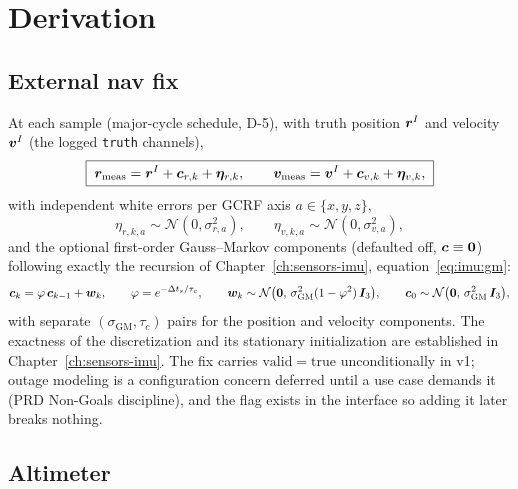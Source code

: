\section{Derivation}
\label{sec:radio:derivation}

\subsection{External nav fix}
\label{sec:radio:fix}

At each sample (major-cycle schedule, D-5), with truth position
$\bm{r}^{I}$ and velocity $\bm{v}^{I}$ (the logged \texttt{truth}
channels),
\begin{equation}
  \boxed{\;
  \bm{r}_{\mathrm{meas}} = \bm{r}^{I} + \bm{c}_{r,k} + \bm{\eta}_{r,k},
  \qquad
  \bm{v}_{\mathrm{meas}} = \bm{v}^{I} + \bm{c}_{v,k} + \bm{\eta}_{v,k},
  \;}
  \label{eq:radio:fix}
\end{equation}
with independent white errors per GCRF axis $a \in \{x,y,z\}$,
\begin{equation}
  \eta_{r,k,a} \sim \mathcal{N}(0, \sigma_{r,a}^2),
  \qquad
  \eta_{v,k,a} \sim \mathcal{N}(0, \sigma_{v,a}^2),
  \label{eq:radio:white}
\end{equation}
and the optional first-order Gauss--Markov components (defaulted off,
$\bm{c} \equiv \bm{0}$) following exactly the recursion of
Chapter~\ref{ch:sensors-imu}, equation~\eqref{eq:imu:gm}:
\begin{equation}
  \bm{c}_{k} = \varphi\,\bm{c}_{k-1} + \bm{w}_k,
  \qquad
  \varphi = e^{-\Delta t_s/\tau_c},
  \qquad
  \bm{w}_k \sim \mathcal{N}\bigl(\bm{0},\,
    \sigma_{\mathrm{GM}}^2(1 - \varphi^2)\,\bm{I}_3\bigr),
  \qquad
  \bm{c}_{0} \sim \mathcal{N}\bigl(\bm{0},\,
    \sigma_{\mathrm{GM}}^2\,\bm{I}_3\bigr),
  \label{eq:radio:gm}
\end{equation}
with separate $(\sigma_{\mathrm{GM}}, \tau_c)$ pairs for the position
and velocity components. The exactness of the discretization and its
stationary initialization are established in
Chapter~\ref{ch:sensors-imu}. The fix carries
$\mathrm{valid} = \mathrm{true}$ unconditionally in v1; outage modeling
is a configuration concern deferred until a use case demands it (PRD
Non-Goals discipline), and the flag exists in the interface so adding it
later breaks nothing.

\subsection{Altimeter}
\label{sec:radio:alt}

